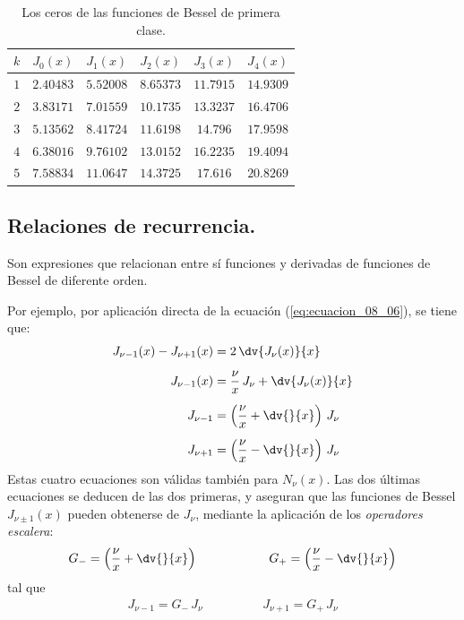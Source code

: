 \begin{table}[H]
\centering
\begin{tabular}{c | c | c | c | c | c}
$k$ & $J_{0} (x)$ & $J_{1} (x)$ & $J_{2} (x)$ & $J_{3} (x)$ & $J_{4} (x)$ \\ \hline
$1$ & $2.40483$ & $5.52008$ & $8.65373$ & $11.7915$ & $14.9309$ \\
$2$ & $3.83171$ & $7.01559$ & $10.1735$ & $13.3237$ & $16.4706$ \\
$3$ & $5.13562$ & $8.41724$ & $11.6198$ & $14.796$ & $17.9598$ \\
$4$ & $6.38016$ & $9.76102$ & $13.0152$ & $16.2235$ & $19.4094$ \\
$5$ & $7.58834$ & $11.0647$ & $14.3725$ & $17.616$& $20.8269$ \\
\end{tabular}
\caption{Los ceros de las funciones de Bessel de primera clase.}
\label{table:tabla_ceros_Bessel}
\end{table}



\subsection{Relaciones de recurrencia.}

Son expresiones que relacionan entre sí funciones y derivadas de funciones de Bessel de diferente orden.
\par
Por ejemplo, por aplicación directa de la ecuación (\ref{eq:ecuacion_08_06}), se tiene que:
\begin{align*}
J_{\nu-1} (x) - J_{\nu+1} (x)&= 2 \, \dv{J_{\nu}(x)}{x} \\[0.5em]
J_{\nu-1} (x) &= \dfrac{\nu}{x} \, J_{\nu} + \dv{J_{\nu}(x)}{x} \\[0.5em]
J_{\nu-1} &= \left( \dfrac{\nu}{x} + \dv{}{x} \right) \, J_{\nu} \\[0.5em]
J_{\nu+1} &= \left( \dfrac{\nu}{x} - \dv{}{x} \right) \, J_{\nu}
\end{align*}
Estas cuatro ecuaciones son válidas también para $N_{\nu} (x)$. Las dos últimas ecuaciones se deducen de las dos primeras, y aseguran que las funciones de Bessel $J_{\nu \pm 1} (x)$ pueden obtenerse de $J_{\nu}$, mediante la aplicación de los \emph{operadores escalera}:
\begin{align*}
G_{-} = \left( \dfrac{\nu}{x} + \dv{}{x} \right) \hspace{2cm} G_{+} = \left( \dfrac{\nu}{x} - \dv{}{x} \right)
\end{align*}
tal que
\begin{align*}
J_{\nu-1} = G_{-} \, J_{\nu} \hspace{2cm} J_{\nu+1} = G_{+} \, J_{\nu}
\end{align*}

